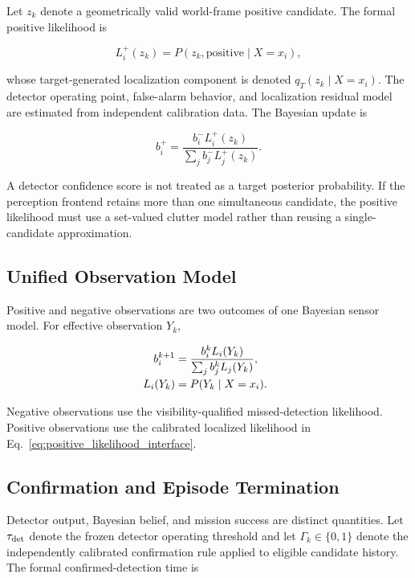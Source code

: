 \documentclass[conference]{IEEEtran}
\begin{document}
Let $z_k$ denote a geometrically valid world-frame positive candidate. The
formal positive likelihood is

\begin{equation}
L_i^+(z_k)=P(z_k,\mathrm{positive}\mid X=x_i),
\label{eq:positive_likelihood_interface}
\end{equation}

whose target-generated localization component is denoted
$q_T(z_k\mid X=x_i)$. The detector operating point, false-alarm behavior, and
localization residual model are estimated from independent calibration data.
The Bayesian update is

\begin{equation}
b_i^+=
\frac{b_i^-L_i^+(z_k)}{\sum_j b_j^-L_j^+(z_k)}.
\label{eq:positive_update}
\end{equation}

A detector confidence score is not treated as a target posterior probability.
If the perception frontend retains more than one simultaneous candidate, the
positive likelihood must use a set-valued clutter model rather than reusing a
single-candidate approximation.

\subsection{Unified Observation Model}

Positive and negative observations are two outcomes of one Bayesian sensor
model. For effective observation $Y_k$,

\begin{equation}
\hspace{-0.8em}
\begin{aligned}
b_i^{k+1}
&=\frac{b_i^kL_i(Y_k)}{\sum_j b_j^kL_j(Y_k)},\\[-0.3ex]
L_i(Y_k)
&=P(Y_k\mid X=x_i).
\end{aligned}
\label{eq:unified_bayes}
\end{equation}

Negative observations use the visibility-qualified missed-detection
likelihood. Positive observations use the calibrated localized likelihood in
Eq.~\eqref{eq:positive_likelihood_interface}.

\subsection{Confirmation and Episode Termination}

Detector output, Bayesian belief, and mission success are distinct quantities.
Let $\tau_{\rm det}$ denote the frozen detector operating threshold and let
$\Gamma_k\in\{0,1\}$ denote the independently calibrated confirmation rule
applied to eligible candidate history. The formal confirmed-detection time is
\end{document}
